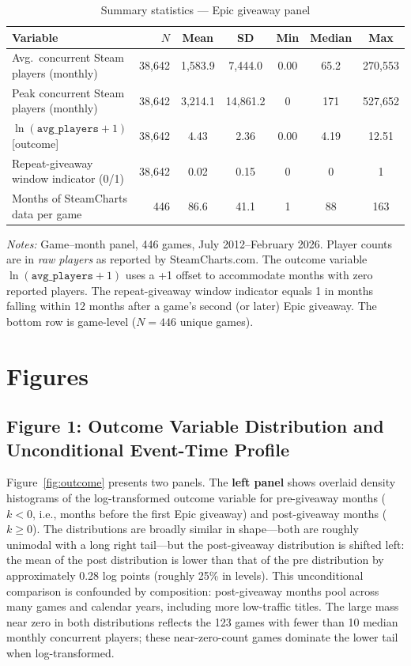 \documentclass[11pt]{article}
\begin{document}
\begin{table}[h]
\centering\small
\caption{Summary statistics --- Epic giveaway panel}
\label{tab:sumstats}
\begin{tabular}{lrccccc}
\toprule
Variable & $N$ & Mean & SD & Min & Median & Max \\
\midrule
Avg.\ concurrent Steam players (monthly) & 38,642 & 1,583.9 & 7,444.0 & 0.00 & 65.2 & 270,553 \\
Peak concurrent Steam players (monthly)  & 38,642 & 3,214.1 & 14,861.2 & 0 & 171 & 527,652 \\
$\ln(\texttt{avg\_players}+1)$ [outcome] & 38,642 & 4.43 & 2.36 & 0.00 & 4.19 & 12.51 \\
Repeat-giveaway window indicator (0/1)   & 38,642 & 0.02 & 0.15 & 0 & 0 & 1 \\
\midrule
Months of SteamCharts data per game & 446 & 86.6 & 41.1 & 1 & 88 & 163 \\
\bottomrule
\end{tabular}
\medskip

\noindent\small\textit{Notes:} Game--month panel, 446 games, July 2012--February 2026.
  Player counts are in \textit{raw players} as reported by SteamCharts.com.
  The outcome variable $\ln(\texttt{avg\_players}+1)$ uses a +1 offset to accommodate
  months with zero reported players.
  The repeat-giveaway window indicator equals 1 in months falling within 12 months
  after a game's second (or later) Epic giveaway.
  The bottom row is game-level ($N = 446$ unique games).
\end{table}

\section{Figures}

\subsection*{Figure 1: Outcome Variable Distribution and Unconditional Event-Time Profile}

Figure~\ref{fig:outcome} presents two panels. The \textbf{left panel} shows overlaid
density histograms of the log-transformed outcome variable for pre-giveaway months
($k < 0$, i.e., months before the first Epic giveaway) and post-giveaway months
($k \geq 0$). The distributions are broadly similar in shape---both are roughly
unimodal with a long right tail---but the post-giveaway distribution is shifted
left: the mean of the post distribution is lower than that of the pre distribution
by approximately 0.28 log points (roughly 25\% in levels). This unconditional
comparison is confounded by composition: post-giveaway months pool across many
games and calendar years, including more low-traffic titles. The large mass near
zero in both distributions reflects the 123 games with fewer than 10 median
monthly concurrent players; these near-zero-count games dominate the lower tail
when log-transformed.
\end{document}
